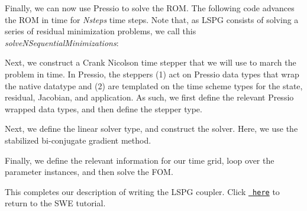 \begin{DoxyCode}{0}
\end{DoxyCode}


Finally, we can now use Pressio to solve the R\+OM. The following code advances the R\+OM in time for {\itshape Nsteps} time steps. Note that, as L\+S\+PG consists of solving a series of residual minimization problems, we call this {\itshape solve\+N\+Sequential\+Minimizations}\+: 
\begin{DoxyCode}{0}
\end{DoxyCode}


Next, we construct a Crank Nicolson time stepper that we will use to march the problem in time. In Pressio, the steppers (1) act on Pressio data types that wrap the native datatype and (2) are templated on the time scheme types for the state, residual, Jacobian, and application. As such, we first define the relevant Pressio wrapped data types, and then define the stepper type. 
\begin{DoxyCode}{0}
\end{DoxyCode}


Next, we define the linear solver type, and construct the solver. Here, we use the stabilized bi-\/conjugate gradient method. 
\begin{DoxyCode}{0}
\end{DoxyCode}


Finally, we define the relevant information for our time grid, loop over the parameter instances, and then solve the F\+OM. 
\begin{DoxyCode}{0}
\end{DoxyCode}


This completes our description of writing the L\+S\+PG coupler. Click \href{./md_pages_tutorials_tutorial3.html}{\texttt{ here}} to return to the S\+WE tutorial. 